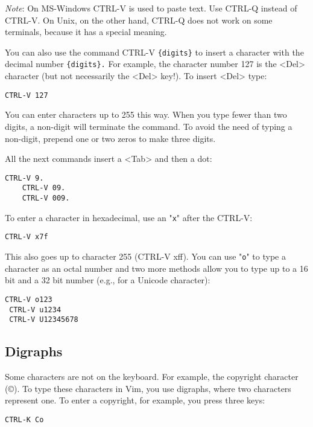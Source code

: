 \emph{Note}: On MS-Windows CTRL-V is used to paste text.
Use CTRL-Q instead of CTRL-V.
On Unix, on the other hand, CTRL-Q does not work on some terminals, because it has a special meaning.

You can also use the command CTRL-V \verb!{digits}! to insert a character with the decimal number \verb!{digits}.!
For example, the character number 127 is the <Del> character (but not necessarily the <Del> key!).
To insert <Del> type:

\begin{Verbatim}[samepage=true]
 CTRL-V 127
\end{Verbatim}

You can enter characters up to 255 this way.
When you type fewer than two digits, a non-digit will terminate the command.
To avoid the need of typing a non-digit, prepend one or two zeros to make three digits.

All the next commands insert a <Tab> and then a dot:

\begin{Verbatim}[samepage=true]
    CTRL-V 9.
    CTRL-V 09.
    CTRL-V 009.
\end{Verbatim}

To enter a character in hexadecimal, use an "\verb!x!" after the CTRL-V:

\begin{Verbatim}[samepage=true]
 CTRL-V x7f
\end{Verbatim}

This also goes up to character 255 (CTRL-V xff).
You can use "\verb!o!" to type a character as an octal number and two more methods allow you to type up to a 16 bit and a 32 bit number (e.g., for a Unicode character):

\begin{Verbatim}[samepage=true]
 CTRL-V o123
 CTRL-V u1234
 CTRL-V U12345678
\end{Verbatim}
\subsection{Digraphs}
\label{Digraphs}
Some characters are not on the keyboard.
For example, the copyright character (©).
To type these characters in Vim, you use digraphs, where two characters represent one.
To enter a copyright, for example, you press three keys:

\begin{Verbatim}[samepage=true]
 CTRL-K Co
\end{Verbatim}

